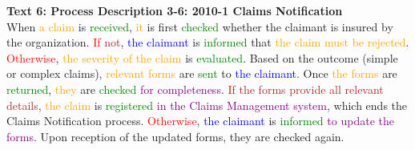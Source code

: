 \textbf{Text 6: Process Description 3-6: 2010-1 Claims Notification}\\
When \textcolor{orange}{a} \textcolor{orange}{claim} is \textcolor{green}{received}, \textcolor{orange}{it} is first \textcolor{green}{checked} whether the claimant is insured by the organization. \textcolor{red}{If} \textcolor{brown}{not}, \textcolor{blue}{the} \textcolor{blue}{claimant} is \textcolor{green}{informed} that \textcolor{orange}{the} \textcolor{orange}{claim} \textcolor{orange}{must} \textcolor{orange}{be} \textcolor{orange}{rejected}. \textcolor{red}{Otherwise}, \textcolor{orange}{the} \textcolor{orange}{severity} \textcolor{orange}{of} \textcolor{orange}{the} \textcolor{orange}{claim} is \textcolor{green}{evaluated}. Based on the outcome (simple or complex claims), \textcolor{orange}{relevant} \textcolor{orange}{forms} are \textcolor{green}{sent} to \textcolor{blue}{the} \textcolor{blue}{claimant}. Once \textcolor{orange}{the} \textcolor{orange}{forms} are \textcolor{green}{returned}, \textcolor{orange}{they} are \textcolor{green}{checked} \textcolor{purple}{for} \textcolor{purple}{completeness}. \textcolor{red}{If} \textcolor{brown}{the} \textcolor{brown}{forms} \textcolor{brown}{provide} \textcolor{brown}{all} \textcolor{brown}{relevant} \textcolor{brown}{details}, \textcolor{orange}{the} \textcolor{orange}{claim} is \textcolor{green}{registered} \textcolor{purple}{in} \textcolor{purple}{the} \textcolor{purple}{Claims} \textcolor{purple}{Management} \textcolor{purple}{system}, which ends the Claims Notification process. \textcolor{red}{Otherwise}, \textcolor{blue}{the} \textcolor{blue}{claimant} is \textcolor{green}{informed} \textcolor{purple}{to} \textcolor{purple}{update} \textcolor{purple}{the} \textcolor{purple}{forms}. Upon reception of the updated forms, they are checked again.

